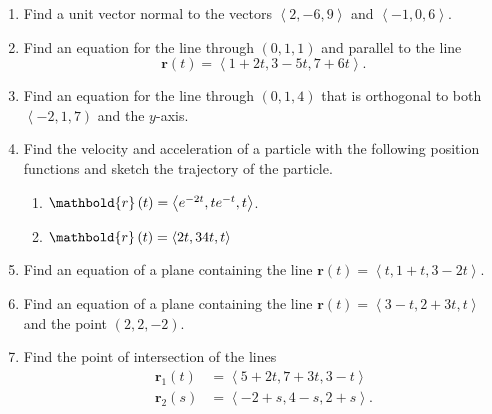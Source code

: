 \documentclass[12pt]{article}
\let\sin\relax\DeclareMathOperator{\sin}{\mathsf{sin}}
\let\arctan\relax\DeclareMathOperator{\arctan}{\mathsf{arctan}}
\let\cos\relax\DeclareMathOperator{\cos}{\mathsf{cos}}
\begin{document}
\begin{enumerate}
\item Find a unit vector normal to the vectors
$\left\langle 2,-6,9\right\rangle$ and
$\left\langle -1,0,6\right\rangle$.
\item Find an equation for the line through
$\left(0,1,1\right)$ and parallel to the line
\[\mathbold{r}\left(t\right)=\left\langle
1+2t,3-5t,7+6t\right\rangle.\]
\item Find an equation for the line through
$\left(0,1,4\right)$ that is orthogonal to both
$\left\langle -2,1,7\right)$ and the $y$-axis.
\item Find the velocity and acceleration of
a particle with the following position
functions and sketch the trajectory
of the particle.
\begin{enumerate}
\item $\mathbold{r}\left(t\right)=\left\langle
e^{-2t},te^{-t},\arctan{t}\right\rangle$.
\item $\mathbold{r}\left(t\right)=\left\langle
\sin{2t},3\cos{4t},t\right\rangle$
\end{enumerate}
\item Find an equation of a plane containing the line
$\mathbold{r}\left(t\right)=\left\langle
t,1+t,3-2t\right\rangle$.
\item Find an equation of a plane containing the line
$\mathbold{r}\left(t\right)=\left\langle
3-t,2+3t,t\right\rangle$ and the point $\left(2,2,-2\right)$.
\item Find the point of intersection of the lines
\begin{align*}
\mathbold{r}_1\left(t\right)
&=\left\langle 5+2t,7+3t,3-t\right\rangle\\
\mathbold{r}_2\left(s\right)
&=\left\langle -2+s,4-s,2+s\right\rangle.
\end{align*}
\end{enumerate}
\end{document}
